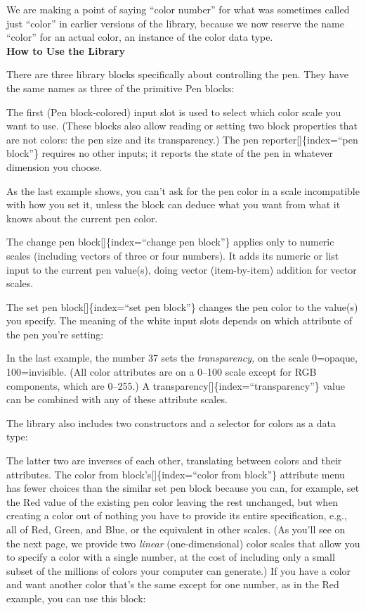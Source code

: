 \documentclass[
  letterpaper,
]{book}
\begin{document}
We are making a point of saying ``color number'' for what was sometimes
called just ``color'' in earlier versions of the library, because we now
reserve the name ``color'' for an actual color, an instance of the color
data type.\\
\textbf{How to Use the Library}

There are three library blocks specifically about controlling the pen.
They have the same names as three of the primitive Pen blocks:

The first (Pen block-colored) input slot is used to select which color
scale you want to use. (These blocks also allow reading or setting two
block properties that are not colors: the pen size and its
transparency.) The pen reporter{[}{]}\{index=``pen block''\} requires no
other inputs; it reports the state of the pen in whatever dimension you
choose.

As the last example shows, you can't ask for the pen color in a scale
incompatible with how you set it, unless the block can deduce what you
want from what it knows about the current pen color.

The change pen block{[}{]}\{index=``change pen block''\} applies only to
numeric scales (including vectors of three or four numbers). It adds its
numeric or list input to the current pen value(s), doing vector
(item-by-item) addition for vector scales.

The set pen block{[}{]}\{index=``set pen block''\} changes the pen color
to the value(s) you specify. The meaning of the white input slots
depends on which attribute of the pen you're setting:

In the last example, the number 37 sets the \emph{transparency,} on the
scale 0=opaque, 100=invisible. (All color attributes are on a 0--100
scale except for RGB components, which are 0--255.) A
transparency{[}{]}\{index=``transparency''\} value can be combined with
any of these attribute scales.

The library also includes two constructors and a selector for colors as
a data type:

The latter two are inverses of each other, translating between colors
and their attributes. The color from block's{[}{]}\{index=``color from
block''\} attribute menu has fewer choices than the similar set pen
block because you can, for example, set the Red value of the existing
pen color leaving the rest unchanged, but when creating a color out of
nothing you have to provide its entire specification, e.g., all of Red,
Green, and Blue, or the equivalent in other scales. (As you'll see on
the next page, we provide two \emph{linear} (one-dimensional) color
scales that allow you to specify a color with a single number, at the
cost of including only a small subset of the millions of colors your
computer can generate.) If you have a color and want another color
that's the same except for one number, as in the Red example, you can
use this block:
\end{document}
